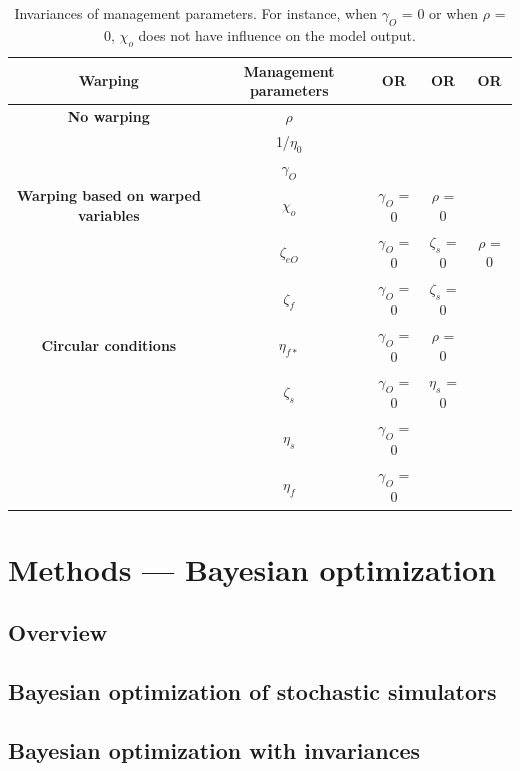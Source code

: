 \begin{table}[htbp]
	\centering
	\caption{Invariances of management parameters. For instance, when  $\gamma_{O}$ = 0 or when $\rho$ = 0, $\chi_{o}$ does not have influence on the model output. }
	\begin{tabular}{|c|c|c|c|c|}
		\midrule
		\textbf{Warping} & \textbf{Management parameters} & \textbf{OR} & \textbf{OR} & \textbf{OR} \\
		\midrule
		\textbf{No warping} & $\rho$ & & & \\
		\cmidrule{2-5} & 1/$\eta_{0}$ & & & \\
		\cmidrule{2-5} & $\gamma_{O}$ & & & \\
		\midrule
		\textbf{Warping based on warped variables} & $\chi_{o}$ & $\gamma_{O}$ = 0 & $\rho$ = 0 & \\
		\cmidrule{2-5} & $\zeta_{eO}$ & $\gamma_{O}$ = 0 & $\zeta_{s}$ = 0 & $\rho$ = 0\\
		\cmidrule{2-5} & $\zeta_{f}$ & $\gamma_{O}$ = 0 & $\zeta_{s}$ = 0 & \\
		\midrule
		\textbf{Circular conditions} & $\eta_{f*}$ & $\gamma_{O}$ = 0 & $\rho$ = 0 & \\
		\cmidrule{2-5} & $\zeta_{s}$ & $\gamma_{O}$ = 0 & $\eta_{s}$ = 0 & \\
		\cmidrule{2-5} & $\eta_{s}$ & $\gamma_{O}$ = 0 & & \\
		\cmidrule{2-5} & $\eta_{f}$ & $\gamma_{O}$ = 0 & & \\
		\midrule

	\end{tabular}%
	\label{tab:table_invariances_parameters}%
\end{table}%


\section{Methods — Bayesian optimization}

\subsection{Overview}

\subsection{Bayesian optimization of stochastic simulators}

\subsection{Bayesian optimization with invariances}

